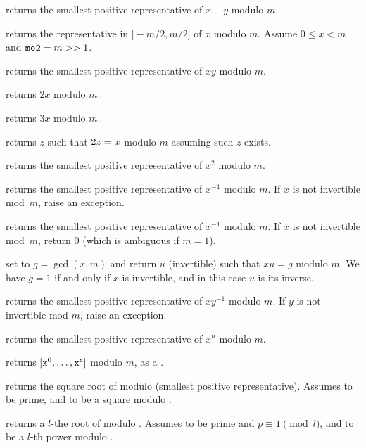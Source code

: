  returns the smallest
positive representative of $x - y$ modulo $m$.

 returns the representative
in $]-m/2,m/2]$ of $x$ modulo $m$. Assume $0 \leq x < m$ and
${\tt mo2}  = m >> 1$.

 returns the smallest positive
representative of $x y$ modulo $m$.

 returns $2x$ modulo $m$.

 returns $3x$ modulo $m$.

 returns $z$ such that $2\*z = x$ modulo
$m$ assuming such $z$ exists.

 returns the smallest positive
representative of $x^2$ modulo $m$.

 returns the smallest
positive representative of $x^{-1}$ modulo $m$. If $x$ is not invertible
mod~$m$, raise an exception.

 returns the smallest
positive representative of $x^{-1}$ modulo $m$. If $x$ is not invertible
mod~$m$, return $0$ (which is ambiguous if $m=1$).

 set  to
$g = \gcd(x,m)$ and return $u$ (invertible) such that $x u = g$ modulo $m$.
We have $g = 1$ if and only if $x$ is invertible, and in this case $u$
is its inverse.

 returns the smallest
positive representative of $x y^{-1}$ modulo $m$. If $y$ is not invertible
mod $m$, raise an exception.

 returns the smallest
positive representative of $x^n$ modulo $m$.

 returns
$[{\tt x}^0, \dots, {\tt x}^{\tt n}]$ modulo $m$, as a .

 returns the square root of 
modulo  (smallest positive representative). Assumes  to be
prime, and  to be a square modulo .

 returns a $l$-the root of 
modulo . Assumes  to be prime and $p \equiv 1 \pmod{l}$, and
 to be a $l$-th power modulo .

